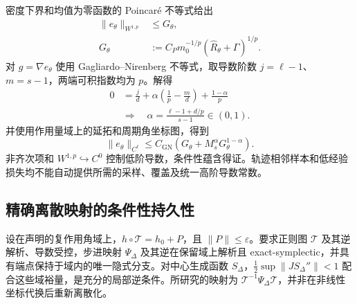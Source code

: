 密度下界和均值为零函数的 Poincar\'e 不等式给出
\begin{equation}
 \begin{aligned}
 \|e_\theta\|_{W^{1,p}}&\le G_\theta,\\
 G_\theta&:=C_Pm_0^{-1/p}(\widehat R_\theta+\Gamma)^{1/p}.
 \end{aligned}
 \label{eq:supp-learn-poincare}
\end{equation}
对 $g=\nabla e_\theta$ 使用 Gagliardo--Nirenberg 不等式，取导数阶数 $j=\ell-1$、$m=s-1$，两端可积指数均为 $p$。解得
\begin{equation}
 \begin{aligned}
 0&=\frac{j}{d}+\alpha\left(\frac1p-\frac{m}{d}\right)+\frac{1-\alpha}{p}\\
 &\Longrightarrow\quad
 \alpha=\frac{\ell-1+d/p}{s-1}\in(0,1).
 \end{aligned}
 \label{eq:supp-learn-interpolation-exponent}
\end{equation}
并使用作用量域上的延拓和周期角坐标图，得到
\begin{equation}
 \|e_\theta\|_{C^\ell}
 \le C_{\mathrm{GN}}\left(G_\theta+M_s^\alpha G_\theta^{1-\alpha}\right).
 \label{eq:supp-learn-interpolation-result}
\end{equation}
非齐次项和 $W^{1,p}\hookrightarrow C^0$ 控制低阶导数，条件性蕴含得证。轨迹相邻样本和低经验损失均不能自动提供所需的采样、覆盖及统一高阶导数常数。

\subsection{精确离散映射的条件性持久性}
设在声明的复作用角域上，$h\circ\mathcal T=h_0+P$，且 $\|P\|\le\varepsilon$。要求正则图 $\mathcal T$ 及其逆解析、导数受控，步进映射 $\Psi_\Delta$ 及其逆在保留域上解析且 exact-symplectic，并具有端点保持于域内的唯一隐式分支。对中心生成函数 $S_\Delta$，$\tfrac12\sup\|JS_\Delta''\|<1$ 配合这些域裕量，是充分的局部逆条件。所研究的映射为 $\mathcal T^{-1}\Psi_\Delta\mathcal T$，并非在非线性坐标代换后重新离散化。

